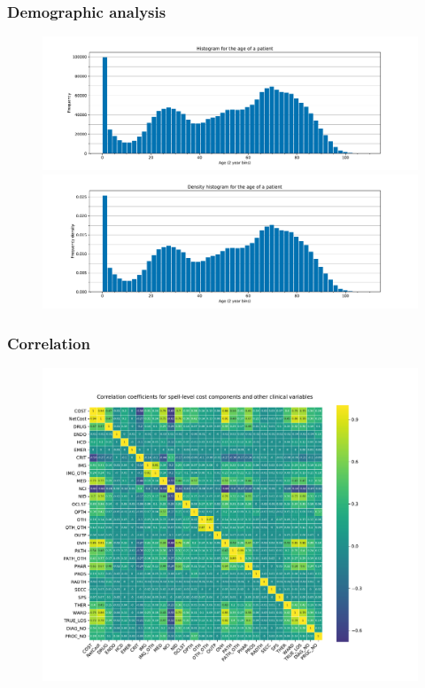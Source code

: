 \documentclass{beamer}
\begin{document}
\begin{frame}
    \frametitle{Demographic analysis}

    \begin{figure}
        \begin{minipage}{\linewidth}
            \includegraphics[width=\linewidth]{./img/age_freq_hist.pdf}
        \end{minipage}
        \begin{minipage}{\linewidth}
            \includegraphics[width=\linewidth]{./img/age_density_hist.pdf}
        \end{minipage}
    \end{figure}
\end{frame}

\begin{frame}
    \frametitle{Correlation}

    \vspace{-15pt}
    \begin{figure}
        \includegraphics[width=\linewidth]{./img/corr_heatmap.pdf}
    \end{figure}
\end{frame}
\end{document}
